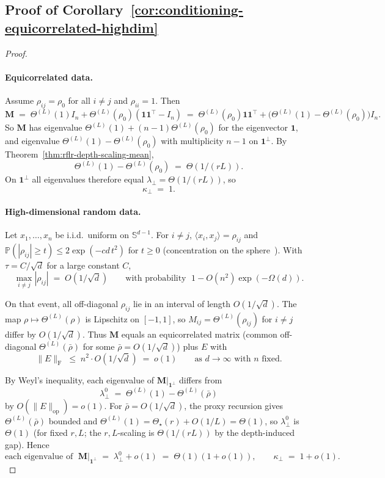 \subsection{Proof of Corollary~\ref{cor:conditioning-equicorrelated-highdim}}\label{appendix:proof-conditioning-equicorrelated-highdim}
\begin{proof}
\paragraph{Equicorrelated data.}
Assume \(\rho_{ij}=\rho_0\) for all \(i\neq j\) and \(\rho_{ii}=1\). Then
\[
\mathbf{M} \;=\; \Theta^{(L)}(1)I_n + \Theta^{(L)}(\rho_0)(\mathbf{1}\mathbf{1}^\top - I_n) \;=\; \Theta^{(L)}(\rho_0)\mathbf{1}\mathbf{1}^\top + \bigl(\Theta^{(L)}(1)-\Theta^{(L)}(\rho_0)\bigr)I_n.
\]
So \(\mathbf{M}\) has eigenvalue \(\Theta^{(L)}(1)+(n-1)\Theta^{(L)}(\rho_0)\) for the eigenvector \(\mathbf{1}\), and eigenvalue \(\Theta^{(L)}(1)-\Theta^{(L)}(\rho_0)\) with multiplicity \(n-1\) on \(\mathbf{1}^\perp\). By Theorem~\ref{thm:rflr-depth-scaling-mean},
\[
\Theta^{(L)}(1)-\Theta^{(L)}(\rho_0)\;=\;\Theta(1/(rL)).
\]
On \(\mathbf{1}^\perp\) all eigenvalues therefore equal \(\lambda_\perp=\Theta(1/(rL))\), so
\[
\kappa_\perp \;=\; 1.
\]

\paragraph{High-dimensional random data.}
Let \(x_1,\ldots,x_n\) be i.i.d.\ uniform on \(\mathbb{S}^{d-1}\). For \(i\neq j\), \(\langle x_i,x_j\rangle=\rho_{ij}\) and \(\mathbb{P}(|\rho_{ij}|\ge t)\le 2\exp(-c d\,t^2)\) for \(t\ge 0\) (concentration on the sphere~\cite{vershynin2018highdimensionalprobability}). With \(\tau=C/\sqrt{d}\) for a large constant \(C\),
\[
\max_{i\neq j}|\rho_{ij}|\;=\; O(1/\sqrt{d}) \qquad \text{with probability }\; 1-O(n^2)\exp(-\Omega(d)).
\]

\medskip\noindent
On that event, all off-diagonal \(\rho_{ij}\) lie in an interval of length \(O(1/\sqrt{d})\). The map \(\rho\mapsto \Theta^{(L)}(\rho)\) is Lipschitz on \([-1,1]\), so \(M_{ij}=\Theta^{(L)}(\rho_{ij})\) for \(i\neq j\) differ by \(O(1/\sqrt{d})\). Thus \(\mathbf{M}\) equals an equicorrelated matrix (common off-diagonal \(\Theta^{(L)}(\bar{\rho})\) for some \(\bar{\rho}=O(1/\sqrt{d})\)) plus \(E\) with
\[
\|E\|_{\mathrm{F}} \;\le\; n^2\cdot O(1/\sqrt{d}) \;=\; o(1) \qquad \text{as } d\to\infty \text{ with } n \text{ fixed}.
\]

\medskip\noindent
By Weyl's inequality, each eigenvalue of \(\mathbf{M}|_{\mathbf{1}^\perp}\) differs from
\[
\lambda_\perp^0 \;=\; \Theta^{(L)}(1)-\Theta^{(L)}(\bar{\rho})
\]
by \(O(\|E\|_{\mathrm{op}})=o(1)\). For \(\bar{\rho}=O(1/\sqrt{d})\), the proxy recursion gives \(\Theta^{(L)}(\bar{\rho})\) bounded and \(\Theta^{(L)}(1)=\Theta_\star(r)+O(1/L)=\Theta(1)\), so \(\lambda_\perp^0\) is \(\Theta(1)\) (for fixed \(r,L\); the \(r,L\)-scaling is \(\Theta(1/(rL))\) by the depth-induced gap). Hence
\[
\text{each eigenvalue of }\;\mathbf{M}|_{\mathbf{1}^\perp}\;=\; \lambda_\perp^0+o(1)\;=\;\Theta(1)(1+o(1)), \qquad \kappa_\perp\;=\;1+o(1).
\]


\end{proof}

